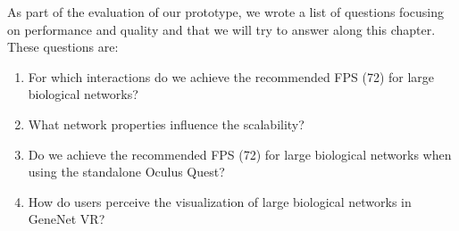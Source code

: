 


As part of the evaluation of our prototype, we wrote a list of questions focusing on performance and quality and that we will try to answer along this chapter. These questions are:
\begin{enumerate}
  \item For which interactions do we achieve the recommended FPS (72) for large biological networks?
  \item What network properties influence the scalability?
  \item Do we achieve the recommended FPS (72) for large biological networks when using the standalone Oculus Quest?
  \item How do users perceive the visualization of large biological networks in GeneNet VR?
\end{enumerate}

